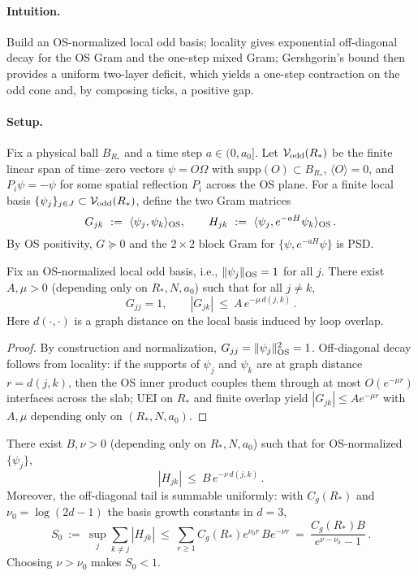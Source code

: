 \documentclass[11pt]{amsart}
\begin{document}
\paragraph{Intuition.} Build an OS-normalized local odd basis; locality gives exponential off-diagonal decay for the OS Gram and the one-step mixed Gram; Gershgorin's bound then provides a uniform two-layer deficit, which yields a one-step contraction on the odd cone and, by composing ticks, a positive gap.

\paragraph{Setup.}
Fix a physical ball $B_{R_*}$ and a time step $a\in(0,a_0]$. Let $\mathcal{V}_{\rm odd}(R_*)$ be the finite linear span of time--zero vectors $\psi=O\Omega$ with $\mathrm{supp}(O)\subset B_{R_*}$, $\langle O\rangle=0$, and $P_i\psi=-\psi$ for some spatial reflection $P_i$ across the OS plane. For a finite local basis $\{\psi_j\}_{j\in J}\subset \mathcal{V}_{\rm odd}(R_*)$, define the two Gram matrices
\[
  G_{jk}\ :=\ \langle\psi_j,\psi_k\rangle_{\rm OS},\qquad
  H_{jk}\ :=\ \langle\psi_j, e^{-aH}\psi_k\rangle_{\rm OS}\,.
\]
By OS positivity, $G\succeq 0$ and the $2\times 2$ block Gram for $\{\psi, e^{-aH}\psi\}$ is PSD.

\begin{lemma}\label{lem:local-gram-bounds}
Fix an OS-normalized local odd basis, i.e., $\|\psi_j\|_{\rm OS}=1$ for all $j$. There exist $A,\mu>0$ (depending only on $R_*,N,a_0$) such that for all $j\ne k$,
\[
  G_{jj}=1,\qquad |G_{jk}|\ \le\ A\,e^{-\mu\, d(j,k)}\,.
\]
Here $d(\cdot,\cdot)$ is a graph distance on the local basis induced by loop overlap.
\end{lemma}

\begin{proof}
By construction and normalization, $G_{jj}=\|\psi_j\|_{\rm OS}^2=1$. Off-diagonal decay follows from locality: if the supports of $\psi_j$ and $\psi_k$ are at graph distance $r=d(j,k)$, then the OS inner product couples them through at most $O(e^{-\mu r})$ interfaces across the slab; UEI on $R_*$ and finite overlap yield $|G_{jk}|\le A e^{-\mu r}$ with $A,\mu$ depending only on $(R_*,N,a_0)$.
\end{proof}

\begin{lemma}\label{lem:mixed-gram-bound}
There exist $B,\nu>0$ (depending only on $R_*,N,a_0$) such that for OS-normalized $\{\psi_j\}$,
\[
  |H_{jk}|\ \le\ B\,e^{-\nu\,d(j,k)}\,.
\]
Moreover, the off-diagonal tail is summable uniformly: with $C_g(R_*)$ and $\nu_0=\log(2d-1)$ the basis growth constants in $d=3$,
\[
  S_0\ :=\ \sup_j \sum_{k\ne j} |H_{jk}|\ \le\ \sum_{r\ge 1} C_g(R_*) e^{\nu_0 r}\, B e^{-\nu r}\ =\ \frac{C_g(R_*) B}{e^{\nu-\nu_0}-1}\,.
\]
Choosing $\nu>\nu_0$ makes $S_0<1$.
\end{lemma}
\end{document}
